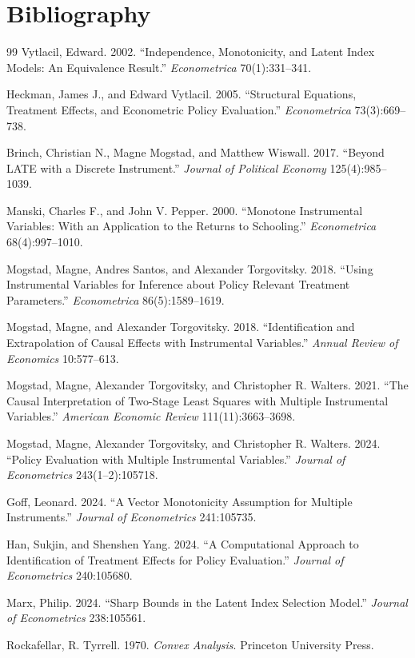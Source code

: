 \documentclass[11pt]{article}
\theoremstyle{definition}
\theoremstyle{plain}
\theoremstyle{remark}
\begin{document}
\section*{Bibliography}
\begin{thebibliography}{99}
Vytlacil, Edward. 2002. ``Independence, Monotonicity, and Latent Index
Models: An Equivalence Result.'' \emph{Econometrica} 70(1):331--341.

Heckman, James J., and Edward Vytlacil. 2005. ``Structural Equations,
Treatment Effects, and Econometric Policy Evaluation.'' \emph{Econometrica}
73(3):669--738.

Brinch, Christian N., Magne Mogstad, and Matthew Wiswall. 2017. ``Beyond LATE
with a Discrete Instrument.'' \emph{Journal of Political Economy}
125(4):985--1039.

Manski, Charles F., and John V. Pepper. 2000. ``Monotone Instrumental
Variables: With an Application to the Returns to Schooling.'' \emph{Econometrica}
68(4):997--1010.

Mogstad, Magne, Andres Santos, and Alexander Torgovitsky. 2018. ``Using
Instrumental Variables for Inference about Policy Relevant Treatment
Parameters.'' \emph{Econometrica} 86(5):1589--1619.

Mogstad, Magne, and Alexander Torgovitsky. 2018. ``Identification and
Extrapolation of Causal Effects with Instrumental Variables.'' \emph{Annual
Review of Economics} 10:577--613.

Mogstad, Magne, Alexander Torgovitsky, and Christopher R. Walters. 2021.
``The Causal Interpretation of Two-Stage Least Squares with Multiple
Instrumental Variables.'' \emph{American Economic Review} 111(11):3663--3698.

Mogstad, Magne, Alexander Torgovitsky, and Christopher R. Walters. 2024.
``Policy Evaluation with Multiple Instrumental Variables.'' \emph{Journal of
Econometrics} 243(1--2):105718.

Goff, Leonard. 2024. ``A Vector Monotonicity Assumption for Multiple
Instruments.'' \emph{Journal of Econometrics} 241:105735.

Han, Sukjin, and Shenshen Yang. 2024. ``A Computational Approach to
Identification of Treatment Effects for Policy Evaluation.'' \emph{Journal of
Econometrics} 240:105680.

Marx, Philip. 2024. ``Sharp Bounds in the Latent Index Selection Model.''
\emph{Journal of Econometrics} 238:105561.

Rockafellar, R. Tyrrell. 1970. \emph{Convex Analysis}. Princeton University
Press.
\end{thebibliography}
\end{document}
